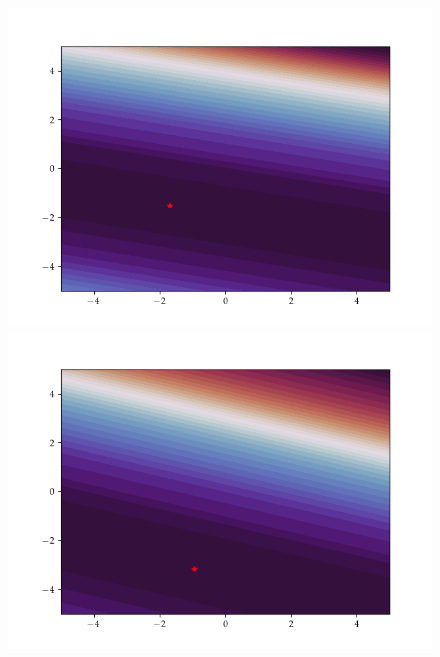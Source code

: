 \begin{figure}[h]
    \begin{minipage}[b]{0.32\textwidth}
        \includegraphics[trim=2.5cm 1.3cm 2.5cm 1.3cm,clip,width=\textwidth]{Figures/coco/f10.png}
    \end{minipage}
    \hfill
    \begin{minipage}[b]{0.32\textwidth}
      \includegraphics[trim=2.5cm 1.3cm 2.5cm 1.3cm,clip,width=\textwidth]{Figures/coco/f11.png}
    \end{minipage}
    \hfill
    \begin{minipage}[b]{0.32\textwidth}

\end{minipage}
\end{figure}
